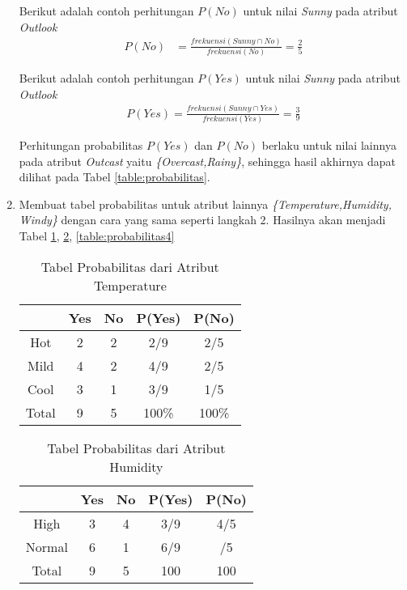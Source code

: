 \begin{enumerate}
Berikut adalah contoh perhitungan $P(No)$ untuk nilai \textit{Sunny} pada atribut \textit{Outlook}
\begin{align*}
P(No) &= \frac{frekuensi(Sunny \cap No)}{frekuensi(No)} = \frac{2}{5}
\end{align*}

Berikut adalah contoh perhitungan $P(Yes)$ untuk nilai \textit{Sunny} pada atribut \textit{Outlook}
\begin{align*}
P(Yes) = \frac{frekuensi(Sunny \cap Yes)}{frekuensi(Yes)} = \frac{3}{9}
\end{align*}

Perhitungan probabilitas $P(Yes)$ dan $P(No)$ berlaku untuk nilai lainnya pada atribut \textit{Outcast} yaitu \textit{\{Overcast,Rainy\}}, sehingga hasil akhirnya dapat dilihat pada Tabel \ref{table:probabilitas}. 

\newpage
\item Membuat tabel probabilitas untuk atribut lainnya \textit{\{Temperature,Humidity, Windy\}} dengan cara yang sama seperti langkah 2. Hasilnya akan menjadi Tabel \ref{table:probabilitas2}, \ref{table:probabilitas3}, \ref{table:probabilitas4}

\begin{table}[h]
\centering
\caption{Tabel Probabilitas dari Atribut Temperature}
\vspace{0.2cm}
\begin{tabular}{|c|c|c|c|c|}
\hline 
 & Yes & No & P(Yes) & P(No) \\ 
\hline 
Hot & 2 & 2 & 2/9 & 2/5 \\ 
\hline 
Mild & 4 & 2 & 4/9 & 2/5 \\ 
\hline 
Cool & 3 & 1 & 3/9 & 1/5 \\ 
\hline 
Total & 9 & 5 & 100\% & 100\% \\ 
\hline 
\end{tabular}
\label{table:probabilitas2}
\end{table}

\begin{table}[h]
\centering
\caption{Tabel Probabilitas dari Atribut Humidity}
\vspace{0.2cm}
\begin{tabular}{|c|c|c|c|c|}
\hline 
 & Yes & No & P(Yes) & P(No) \\ 
\hline 
High & 3 & 4 & 3/9 & 4/5 \\ 
\hline 
Normal & 6 & 1 & 6/9 & /5 \\ 
\hline 
Total & 9 & 5 & 100 & 100 \\ 
\hline 
\end{tabular}
\label{table:probabilitas3}
\end{table}


\end{enumerate}
